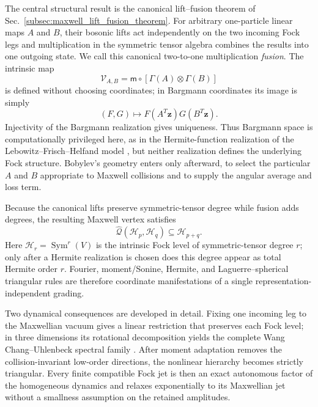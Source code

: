 \documentclass[11pt,oneside]{article}
\numberwithin{equation}{section}
\theoremstyle{definition}
\begin{document}
The central structural result is the canonical lift--fusion theorem of Sec.~\ref{subsec:maxwell_lift_fusion_theorem}.  For arbitrary one-particle linear maps $A$ and $B$, their bosonic lifts act independently on the two incoming Fock legs and multiplication in the symmetric tensor algebra combines the results into one outgoing state.  We call this canonical two-to-one multiplication \emph{fusion}.  The intrinsic map
\begin{equation}
\mathcal V_{A,B}=\mathsf m\circ[\Gamma(A)\otimes\Gamma(B)]
\end{equation}
is defined without choosing coordinates; in Bargmann coordinates its image is simply
\begin{equation}
(F,G)\longmapsto F(A^T\bm z)G(B^T\bm z).
\end{equation}
Injectivity of the Bargmann realization gives uniqueness.  Thus Bargmann space is computationally privileged here, as in the Hermite-function realization of the Lebowitz--Frisch--Helfand model \cite{Karlin2026LFHFock}, but neither realization defines the underlying Fock structure.  Bobylev's geometry enters only afterward, to select the particular $A$ and $B$ appropriate to Maxwell collisions and to supply the angular average and loss term.

Because the canonical lifts preserve symmetric-tensor degree while fusion adds degrees, the resulting Maxwell vertex satisfies
\begin{equation}
\boxed{
\widehat{\mathcal Q}(\mathscr H_p,\mathscr H_q)
\subseteq
\mathscr H_{p+q}.
}
\end{equation}
Here $\mathscr H_r=\operatorname{Sym}^r(V)$ is the intrinsic Fock level of symmetric-tensor degree $r$; only after a Hermite realization is chosen does this degree appear as total Hermite order $r$.  Fourier, moment/Sonine, Hermite, and Laguerre--spherical triangular rules are therefore coordinate manifestations of a single representation-independent grading.

Two dynamical consequences are developed in detail.  Fixing one incoming leg to the Maxwellian vacuum gives a linear restriction that preserves each Fock level; in three dimensions its rotational decomposition yields the complete Wang Chang--Uhlenbeck spectral family \cite{WangChangUhlenbeck1952,WangChangUhlenbeck1970,AltermanFrankowskiPekeris1962,LernerMorimotoPravdaStarovXu2013}.  After moment adaptation removes the collision-invariant low-order directions, the nonlinear hierarchy becomes strictly triangular.  Every finite compatible Fock jet is then an exact autonomous factor of the homogeneous dynamics and relaxes exponentially to its Maxwellian jet without a smallness assumption on the retained amplitudes.
\end{document}
